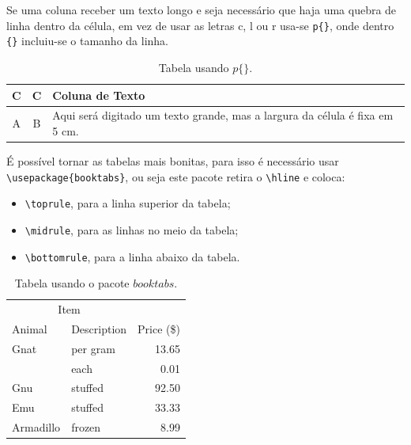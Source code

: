 Se uma coluna receber um texto longo e seja necessário que haja uma quebra de linha dentro da célula, em vez de usar as letras c, l ou r usa-se \verb|p{}|, onde dentro \verb|{}| incluiu-se o tamanho da linha.
\begin{table}[H]
    \renewcommand{\arraystretch}{1.5}
    \centering
    \caption{Tabela usando $p\{\}$.}
    \label{tab3}
    \begin{tabular}{ccp{5cm}}
    \hline
    C & C & Coluna de Texto \\
    \hline
    A & B & Aqui será digitado um texto grande,
    mas a largura da célula é fixa em 5 \si{\cm}.\\
\hline
\end{tabular}
\end{table}\par
É possível tornar as tabelas mais bonitas, para isso é necessário  usar \verb|\usepackage{booktabs}|, ou seja este pacote retira o \verb|\hline| e coloca: 
\begin{itemize}
    \item \verb|\toprule|, para a linha superior da tabela;
    \item \verb|\midrule|, para as linhas no meio da tabela;
    \item \verb|\bottomrule|, para a linha abaixo da tabela.
\end{itemize}
\begin{table}[H]
    \renewcommand{\arraystretch}{1.15}
    \centering
    \caption{Tabela usando o pacote $booktabs$.}
    \label{tabela3}
    \begin{tabular}{llr}
        \toprule
        \multicolumn{2}{c}{Item} \\
        \cmidrule(r){1-2}
        Animal & Description & Price (\$)\\ \midrule
        Gnat & per gram & 13.65 \\
        & each & 0.01 \\
        Gnu & stuffed & 92.50 \\
        Emu & stuffed & 33.33 \\
        Armadillo & frozen & 8.99 \\
        \bottomrule
    \end{tabular}
\end{table}


